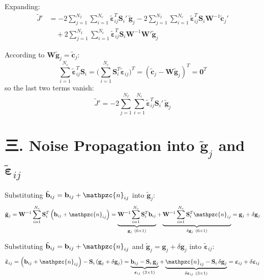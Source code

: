 \documentclass[11pt]{article}
\newcommand{\nn}{\mathpzc{n}}   %
\begin{document}
Expanding:
\[
\begin{aligned}
\tilde{J}'&=-2\sum_{j=1}^{N_I}\sum_{i=1}^{N_c}\tilde{\boldsymbol{\varepsilon}}_{ij}^{T}\mathbf{S}_i'\,\tilde{\mathbf{g}}_j
-2\sum_{j=1}^{N_I}\sum_{i=1}^{N_c}\tilde{\boldsymbol{\varepsilon}}_{ij}^{T}\mathbf{S}_i\mathbf{W}^{-1}\tilde{\mathbf{c}}_j'\\
&\quad+2\sum_{j=1}^{N_I}\sum_{i=1}^{N_c}\tilde{\boldsymbol{\varepsilon}}_{ij}^{T}\mathbf{S}_i\mathbf{W}^{-1}\mathbf{W}'\tilde{\mathbf{g}}_j
\end{aligned}
\]

According to $\mathbf{W}\tilde{\mathbf{g}}_j=\tilde{\mathbf{c}}_j$:
\[
\sum_{i=1}^{N_c}\tilde{\boldsymbol{\varepsilon}}_{ij}^{T}\mathbf{S}_i
=\Big(\sum_{i=1}^{N_c}\mathbf{S}_i^{T}\tilde{\boldsymbol{\varepsilon}}_{ij}\Big)^{T}
=\left(\tilde{\mathbf{c}}_j-\mathbf{W}\tilde{\mathbf{g}}_j\right)^{T}=\mathbf{0}^{T}
\]
so the last two terms vanish:
\[
\tilde{J}'=-2\sum_{j=1}^{N_I}\sum_{i=1}^{N_c}\tilde{\boldsymbol{\varepsilon}}_{ij}^{T}\mathbf{S}_i'\,\tilde{\mathbf{g}}_j
\]

\section*{{\cjk 三.} Noise Propagation into $\tilde{\mathbf{g}}_j$ and $\tilde{\boldsymbol{\varepsilon}}_{ij}$}

Substituting $\tilde{\mathbf{b}}_{ij}=\mathbf{b}_{ij}+\nn_{ij}$ into $\tilde{\mathbf{g}}_j$:
\[
\tilde{\mathbf{g}}_j=\mathbf{W}^{-1}\sum_{i=1}^{N_c}\mathbf{S}_i^{T}\left(\mathbf{b}_{ij}+\nn_{ij}\right)
=\underbrace{\mathbf{W}^{-1}\sum_{i=1}^{N_c}\mathbf{S}_i^{T}\mathbf{b}_{ij}}_{\mathbf{g}_j\ (6\times1)}
+\underbrace{\mathbf{W}^{-1}\sum_{i=1}^{N_c}\mathbf{S}_i^{T}\nn_{ij}}_{\delta\mathbf{g}_j\ (6\times1)}
=\mathbf{g}_j+\delta\mathbf{g}_j
\]

Substituting $\tilde{\mathbf{b}}_{ij}=\mathbf{b}_{ij}+\nn_{ij}$ and $\tilde{\mathbf{g}}_j=\mathbf{g}_j+\delta\mathbf{g}_j$ into $\tilde{\boldsymbol{\varepsilon}}_{ij}$:
\[
\tilde{\boldsymbol{\varepsilon}}_{ij}=\left(\mathbf{b}_{ij}+\nn_{ij}\right)-\mathbf{S}_i\left(\mathbf{g}_j+\delta\mathbf{g}_j\right)
=\underbrace{\mathbf{b}_{ij}-\mathbf{S}_i\,\mathbf{g}_j}_{\boldsymbol{\varepsilon}_{ij}\ (3\times1)}
+\underbrace{\nn_{ij}-\mathbf{S}_i\,\delta\mathbf{g}_j}_{\delta\boldsymbol{\varepsilon}_{ij}\ (3\times1)}
=\boldsymbol{\varepsilon}_{ij}+\delta\boldsymbol{\varepsilon}_{ij}
\]
\end{document}
